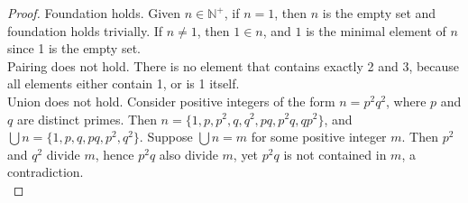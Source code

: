 \documentclass{article}
\begin{document}
\begin{enumerate}
\begin{proof}
      Foundation holds. Given $n\in\mathbb{N}^+$, if $n=1$, then $n$ is the
      empty set and foundation holds trivially. If $n\neq 1$, then $1\in
      n$, and $1$ is the minimal element of $n$ since 1 is the empty set.
      \\

      Pairing does not hold. There is no element that contains exactly 2
      and 3, because all elements either contain 1, or is 1 itself. \\

      Union does not hold. Consider positive integers of the form
      $n=p^2q^2$, where $p$ and $q$ are distinct primes. Then
      $n=\{1,p,p^2,q,q^2,pq,p^2q,qp^2\}$, and $\bigcup
      n=\{1,p,q,pq,p^2,q^2\}$. Suppose $\bigcup n=m$ for some positive
      integer $m$. Then $p^2$ and $q^2$ divide $m$, hence $p^2q$ also
      divide $m$, yet $p^2q$ is not contained in $m$, a contradiction. \\
    \end{proof}
\end{enumerate}
\end{document}
